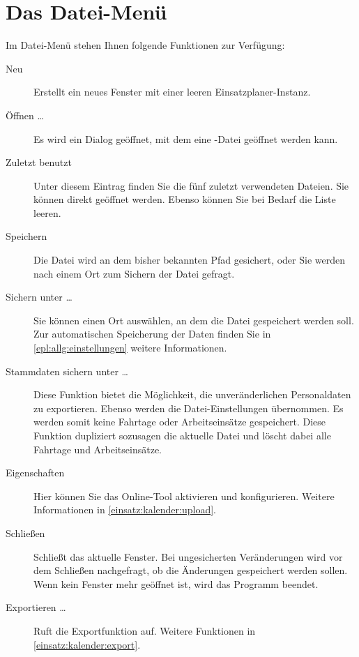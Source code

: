 \section{Das Datei-Menü}
Im Datei-Menü stehen Ihnen folgende Funktionen zur Verfügung:
\begin{description}
  \item[Neu]
  Erstellt ein neues Fenster mit einer leeren Einsatzplaner-Instanz.

  \item[Öffnen \dots]
  Es wird ein Dialog geöffnet, mit dem eine -Datei geöffnet werden kann.

  \item[Zuletzt benutzt]
  Unter diesem Eintrag finden Sie die fünf zuletzt verwendeten Dateien.
  Sie können direkt geöffnet werden.
  Ebenso können Sie bei Bedarf die Liste leeren.

  \item[Speichern]
  Die Datei wird an dem bisher bekannten Pfad gesichert, oder Sie werden nach einem Ort zum Sichern der Datei gefragt.

  \item[Sichern unter \dots]
  Sie können einen Ort auswählen, an dem die Datei gespeichert werden soll.
  Zur automatischen Speicherung der Daten finden Sie in \cref{epl:allg:einstellungen} weitere Informationen.

  \item[Stammdaten sichern unter \dots]
  Diese Funktion bietet die Möglichkeit, die unveränderlichen Personaldaten zu exportieren.
  Ebenso werden die Datei-Einstellungen übernommen.
  Es werden somit keine Fahrtage oder Arbeitseinsätze gespeichert.
  Diese Funktion dupliziert sozusagen die aktuelle Datei und löscht dabei alle Fahrtage und Arbeitseinsätze.


  \item[Eigenschaften]
  Hier können Sie das Online-Tool aktivieren und konfigurieren.
  Weitere Informationen in \cref{einsatz:kalender:upload}.

  \item[Schließen]
  Schließt das aktuelle Fenster.
  Bei ungesicherten Veränderungen wird vor dem Schließen nachgefragt, ob die Änderungen gespeichert werden sollen.
  Wenn kein Fenster mehr geöffnet ist, wird das Programm beendet.

  \item[Exportieren \dots]
  Ruft die Exportfunktion auf.
  Weitere Funktionen in \cref{einsatz:kalender:export}.
\end{description}


